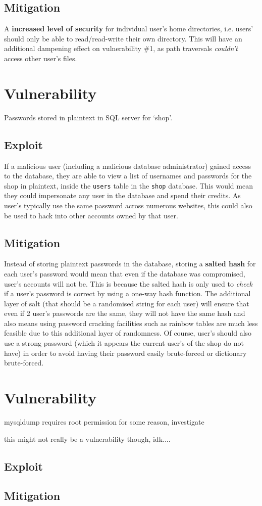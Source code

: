 \documentclass[11pt]{article}
\begin{document}
\subsection{Mitigation}

A \textbf{increased level of security} for individual user's home directories, i.e. users' should only be able to read/read-write their own directory. This will have an additional dampening effect on vulnerability \#1, as path traversals \textit{couldn't} access other user's files.

\section{Vulnerability}

Passwords stored in plaintext in SQL server for `shop'.

\subsection{Exploit}

If a malicious user (including a malicious database administrator) gained access to the database, they are able to view a list of usernames and passwords for the shop in plaintext, inside the \texttt{users} table in the \texttt{shop} database. This would mean they could impersonate any user in the database and spend their credits. As user's typically use the same password across numerous websites, this could also be used to hack into other accounts owned by that user.

\subsection{Mitigation}

Instead of storing plaintext passwords in the database, storing a \textbf{salted hash} for each user's password would mean that even if the database was compromised, user's accounts will not be. This is because the salted hash is only used to \textit{check} if a user's password is correct by using a one-way hash function. The additional layer of salt (that should be a randomised string for each user) will ensure that even if 2 user's passwords are the same, they will not have the same hash and also means using password cracking facilities such as rainbow tables are much less feasible due to this additional layer of randomness. Of course, user's should also use a strong password (which it appears the current user's of the shop do not have) in order to avoid having their password easily brute-forced or dictionary brute-forced.

\section{Vulnerability}

mysqldump requires root permission for some reason, investigate

this might not really be a vulnerability though, idk....

\subsection{Exploit}

\subsection{Mitigation}
\end{document}
